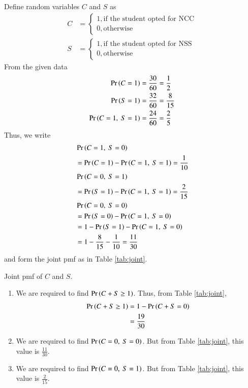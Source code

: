\documentclass[journal,12pt,twocolumn]{IEEEtran}
\begin{document}
\begin{enumerate}
    \solution Define random variables $C$ and $S$ as
    \begin{align}
        C &=
        \begin{cases}
            1, \textrm{if the student opted for NCC} \\
            0, \textrm{otherwise}
        \end{cases} \label{eq:C-def} \\
        S &=
        \begin{cases}
            1, \textrm{if the student opted for NSS} \\
            0, \textrm{otherwise}
        \end{cases} \label{eq:S-def}
    \end{align}
    From the given data
    \begin{align}
        \Pr\left(C=1\right) &= \frac{30}{60} = \frac{1}{2} \label{eq:pr-C} \\
        \Pr\left(S=1\right) &= \frac{32}{60} = \frac{8}{15} \label{eq:pr-S} \\
        \Pr\left(C=1,\ S=1\right) &= \frac{24}{60} = \frac{2}{5} \label{eq:pr-CS}
    \end{align}
    Thus, we write
    \begin{align}
        &\Pr\left(C=1,\ S=0\right) \nonumber \\
        &= \Pr\left(C=1\right) - \Pr\left(C=1,\ S=1\right) = \frac{1}{10} \\
        &\Pr\left(C=0,\ S=1\right) \nonumber \\
        &= \Pr\left(S=1\right) - \Pr\left(C=1,\ S=1\right) = \frac{2}{15} \\
        &\Pr\left(C=0,\ S=0\right) \nonumber \\
        &= \Pr\left(S=0\right) - \Pr\left(C=1,\ S=0\right) \\
        &= 1 - \Pr\left(S=1\right) - \Pr\left(C=1,\ S=0\right) \\
        &= 1 - \frac{8}{15} - \frac{1}{10} = \frac{11}{30}
    \end{align}
    and form the joint pmf as in Table \ref{tab:joint}.
    \begin{table}[!ht]
        \centering
        
        \caption{Joint pmf of $C$ and $S$.}
        \label{tab:joint}
    \end{table}
    \begin{enumerate}
        \item We are required to find $\Pr\left(C+S\ge1\right)$. Thus, from Table 
        \ref{tab:joint},
        \begin{align}
            \Pr\left(C+S\ge1\right) &= 1 - \Pr\left(C+S=0\right) \\
                         &= \frac{19}{30}
        \end{align}
        
        \item We are required to find $\pr{C=0,\ S=0}$. But from Table \ref{tab:joint},
        this value is $\frac{11}{30}$.

        \item We are required to find $\pr{C=0,\ S=1}$. But from Table \ref{tab:joint},
        this value is $\frac{2}{15}$.
    \end{enumerate}
\end{enumerate}
\end{document}
